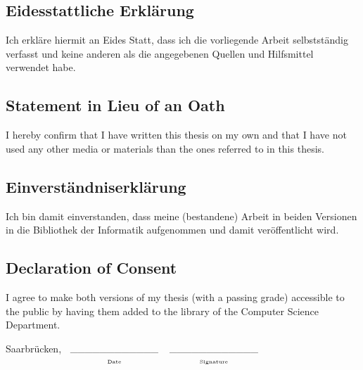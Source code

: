 \begin{minipage}[t][0.97\textheight]{1\columnwidth}%
    \null
    \vfill
\thispagestyle{empty}
    \subsection*{Eidesstattliche Erkl\"arung}

    Ich erkl\"are hiermit an Eides Statt, dass ich die vorliegende Arbeit
    selbstst\"andig verfasst und keine anderen als die angegebenen Quellen
    und Hilfsmittel verwendet habe. 


    \subsection*{Statement in Lieu of an Oath }

    I hereby confirm that I have written this thesis on my own and that
    I have not used any other media or materials than the ones referred
    to in this thesis. 

    \vspace{2cm}



    \subsection*{Einverständniserkl\"arung }

    Ich bin damit einverstanden, dass meine (bestandene) Arbeit in beiden
    Versionen in die Bibliothek der Informatik aufgenommen und damit ver\"offentlicht
    wird. 


    \subsection*{Declaration of Consent }

    I agree to make both versions of my thesis (with a passing grade)
    accessible to the public by having them added to the library of the
    Computer Science Department. 

    \vspace{3cm}


    Saarbr\"ucken, $\begin{array}[t]{c}
        \text{\_\_\_\_\_\_\_\_\_\_\_\_}\\
        {\scriptscriptstyle \text{Date}}
    \end{array}$\hfill{$\begin{array}[t]{c}
        \_\_\_\_\_\_\_\_\_\_\_\_\\
        {\scriptscriptstyle \text{Signature}}
    \end{array}$\hfill}\end{minipage}

